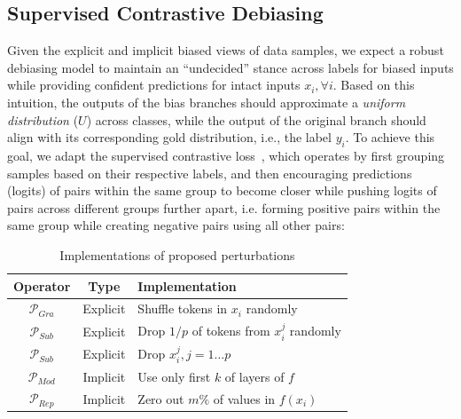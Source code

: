 \subsection{Supervised Contrastive Debiasing}\label{sec:contrastive}
Given the explicit and implicit biased views of data samples, we expect a robust debiasing model to maintain an ``undecided'' stance across labels for biased inputs while providing confident predictions for intact inputs $x_i, \forall i$. Based on this intuition, the outputs of the bias branches should approximate a {\em uniform distribution} ($U$) across classes, while the output of the original branch should align with its corresponding gold distribution, i.e., the label $y_i$. 
To achieve this goal, we adapt the supervised contrastive loss~\citep{khosla2020supervised}, which operates by first grouping samples based on their respective labels, and then encouraging predictions (logits) of pairs within the same group to become closer while pushing logits of pairs across different groups further apart, i.e. forming positive pairs within the same group while creating negative pairs using all other pairs: %

\begin{table}\small
\centering
\setlength{\tabcolsep}{3pt}
\renewcommand{\arraystretch}{1} 
\begin{tabular}{c|c|l}
\toprule
\textbf{Operator}               & \textbf{Type}     & \textbf{Implementation} \\
\midrule
$\mathcal{P}_{Gra}$ & Explicit & Shuffle tokens in $x_i$ randomly \\
$\mathcal{P}_{Sub}$  & Explicit & Drop $1/p$ of tokens from $x_i^j$ randomly \\
$\mathcal{P}_{Sub}$  & Explicit & Drop $x_i^j, j=1\dots p$ \\
\midrule
$\mathcal{P}_{Mod}$  & Implicit & Use only first $k$ of layers of $f$\\
$\mathcal{P}_{Rep}$  & Implicit & Zero out $m\%$ of values in $f(x_i)$ \\
\bottomrule
  \end{tabular}
  \caption{Implementations of proposed perturbations}
  \label{tab:aug_list}
  \vspace{-10pt}
\end{table}


